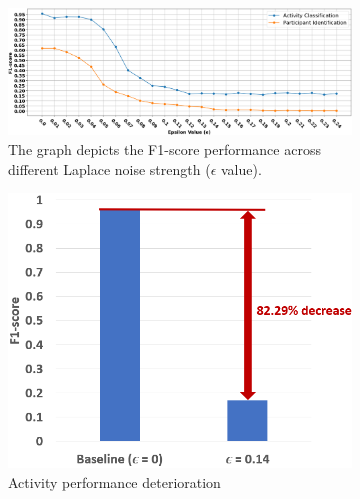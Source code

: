 \documentclass{l4proj}
\begin{document}
\begin{figure}[h]
    \centering
    \begin{subfigure}{1\textwidth}
    \includegraphics[width=1\linewidth]{images/privacy-preservation-epsilon-evaluation-method1-f1-scores.png}
    \caption{The graph depicts the F1-score performance across different Laplace noise strength ($\epsilon$ value).}
    \label{fig:privacy-preservation-epsilon-evaluation-method2-f1-scores-topk1000-performance-difference}
    \end{subfigure}
    \hfill
    \begin{subfigure}{0.35\textwidth}
    \includegraphics[width=\textwidth]{images/privacy-preservation-difference-comparison-method1-activity-f1-scores.png}
    \caption{Activity performance deterioration}
    \label{fig:privacy-preservation-difference-comparison-method1-activity-f1-scores}
    \end{subfigure}
    \qquad
    \begin{subfigure}{0.35\textwidth}

\end{subfigure}
\end{figure}
\end{document}
